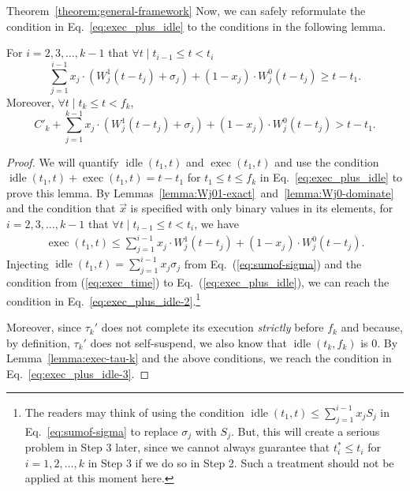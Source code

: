\begin{appProof}{Theorem~\ref{theorem:general-framework}}
Now, we can safely reformulate the condition in Eq.~\eqref{eq:exec_plus_idle} to the conditions in the following lemma.
\begin{Lemma}
  \label{lemma:conclusion-step2}
For $i=2,3,\ldots,k-1$ that $\forall t \mid t_{i-1} \leq t < t_i$
\begin{equation}
\label{eq:exec_plus_idle-2}
\sum_{j=1}^{i-1} x_j\cdot (W_j^1(t-t_j) +\sigma_j) + (1-x_j)\cdot W_j^0(t-t_j) \geq t-t_1.
\end{equation}
 Moreover, $\forall t \mid t_k \leq t < f_k$,
\begin{equation}
\label{eq:exec_plus_idle-3}
C'_k +\sum_{j=1}^{k-1} x_j\cdot (W_j^1(t-t_j) +\sigma_j) + (1-x_j)\cdot W_j^0(t-t_j) > t-t_1.
\end{equation} 
\end{Lemma}
\begin{proof}
  We will quantify $\operatorname{idle}(t_1, t)$ and $\operatorname{exec}(t_1, t)$ and use the condition $\operatorname{idle}(t_1, t)+\operatorname{exec}(t_1, t) = t-t_1$ for $t_1 \leq t \leq f_k$ in Eq.~\eqref{eq:exec_plus_idle} to prove this lemma.
  By Lemmas~\ref{lemma:Wj01-exact}~and~\ref{lemma:Wj0-dominate} and the condition that $\vec{x}$
  is specified with only binary values in its elements, for
  $i=2,3,\ldots,k-1$ that $\forall t \mid t_{i-1} \leq t < t_i$, we
  have
{\small \begin{align}
\label{eq:exec_time}
\operatorname{exec}(t_1, t) \leq \sum_{j=1}^{i-1} x_j\cdot W_j^1(t-t_j)  + (1-x_j)\cdot W_j^0(t-t_j).
\end{align}} Injecting $\operatorname{idle}(t_1, t) = \sum_{j=1}^{i-1}
x_j \sigma_j $ from Eq.~(\ref{eq:sumof-sigma}) and the condition from
(\ref{eq:exec_time}) to Eq.~(\ref{eq:exec_plus_idle}), we can reach
the condition in Eq.~\eqref{eq:exec_plus_idle-2}.\footnote{\label{footnote-why-sigma}The readers
  may think of using the condition $\operatorname{idle}(t_1, t) \leq
  \sum_{j=1}^{i-1} x_j S_j$ in Eq.~\eqref{eq:sumof-sigma} to
  replace $\sigma_j$ with $S_j$. But, this will create a serious
  problem in Step 3 later, since we cannot always guarantee that
  $t_i^*\leq t_i$ for $i=1,2,\ldots,k$ in Step 3 if we do so in Step 2. Such a treatment should not be applied at this moment here.} 

Moreover, since $\tau_k'$ does not complete its execution
\emph{strictly} before $f_k$ and because, by definition, $\tau_k'$
does not self-suspend, we also know that $\operatorname{idle}(t_k,
f_k)$ is $0$. By Lemma~\ref{lemma:exec-tau-k} and the above
conditions, we reach the condition in Eq.~\eqref{eq:exec_plus_idle-3}.
\end{proof}





\end{appProof}
